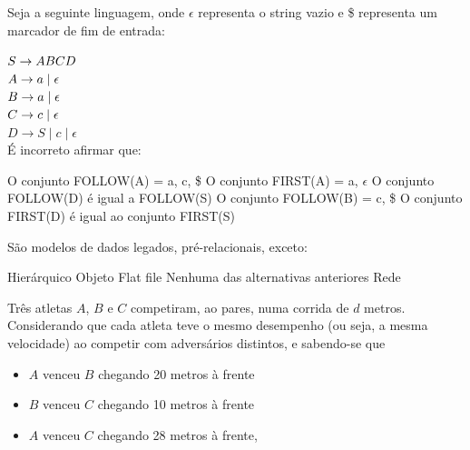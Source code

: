 \documentclass[12pt, addpoints]{exam}
\begin{document}
\begin{questions}
\question

Seja a seguinte linguagem, onde \(\epsilon\) representa o string vazio e \$ representa um marcador de fim de entrada:



$S \rightarrow ABCD \\$\\

$A \rightarrow a \mid \epsilon \\$\\

$B \rightarrow a \mid \epsilon \\$\\

$C \rightarrow c \mid \epsilon \\$\\

$D \rightarrow S \mid c \mid \epsilon$\\



É incorreto afirmar que:
\begin{choices}
\choice O conjunto FOLLOW(A) = a, c, \$
\choice O conjunto FIRST(A) = a, \(\epsilon\)
\choice O conjunto FOLLOW(D) é igual a FOLLOW(S)
\choice O conjunto FOLLOW(B) = c, \$
\choice O conjunto FIRST(D) é igual ao conjunto FIRST(S)
\end{choices}

\question

São modelos de dados legados, pré-relacionais, exceto:


\begin{choices}
\choice Hierárquico
\choice Objeto
\choice Flat file
\choice Nenhuma das alternativas anteriores
\choice Rede
\end{choices}

\question

Três atletas \( A \), \( B \) e \( C \) competiram, ao pares, numa corrida de \( d \) metros. Considerando que cada atleta teve o mesmo desempenho (ou seja, a mesma velocidade) ao competir com adversários distintos, e sabendo-se que



\begin{itemize}

    \item \( A \) venceu \( B \) chegando 20 metros à frente

    \item \( B \) venceu \( C \) chegando 10 metros à frente

    \item \( A \) venceu \( C \) chegando 28 metros à frente,


\end{itemize}
\end{questions}
\end{document}

